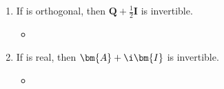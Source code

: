 \begin{itemize}
\begin{enumerate}
{\begin{enumerate}
        \item If  is orthogonal, then \(\bm{Q} +\frac{1}{2} \bm{I}\) is
          invertible.
        \begin{itemize}\color{foreground}
          \item
        \end{itemize}

        \item If  is real, then \(\bm{A} + \i \bm{I}\) is invertible.
        \begin{itemize}\color{foreground}
          \item
        \end{itemize}

      \end{enumerate}
    }


  \end{enumerate}
\end{itemize}

